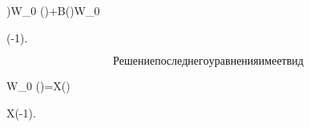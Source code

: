 \right)W_{0} \left(\vartheta\right)+B\left(\vartheta\right)W_{0}


\left(-1\right).


$$


Решение последнего уравнения имеет вид


$$


W_{0} \left(\vartheta\right)=X\left(\vartheta\right)


X\left(-1\right).


$$





